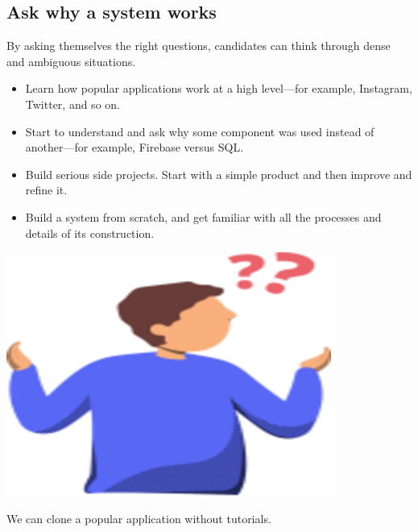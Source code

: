 \subsection{Ask why a system works}\label{gHMwfiHKYodj8pZIrmHvS}

By asking themselves the right questions, candidates can think through dense and ambiguous situations.

\noindent
\begin{minipage}[t]{0.48\textwidth}
\begin{itemize}
\item
Learn how popular applications work at a high level---for example, Instagram, Twitter, and so on.
\item
Start to understand and ask why some component was used instead of another---for example, Firebase versus SQL.
\item
Build serious side projects. Start with a simple product and then improve and refine it.
\item
Build a system from scratch, and get familiar with all the processes and details of its construction.
\end{itemize}
\end{minipage}
\hfill
\begin{minipage}[t]{0.48\textwidth}
\includegraphics[width=0.8\textwidth]{Images/chapter_1/section_5546916426809344/4971437733838848.png}
\end{minipage}

We can clone a popular application without tutorials.

